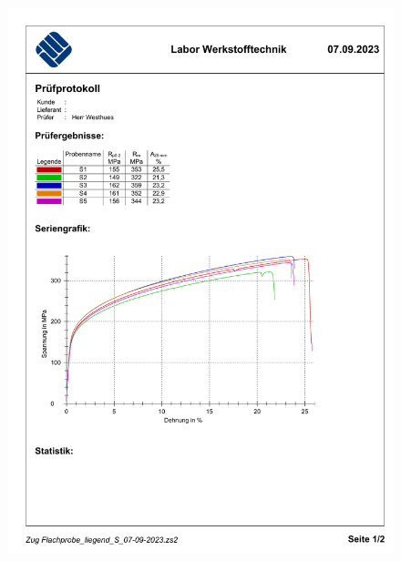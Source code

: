   \begin{figure}[ht]
    \includegraphics[width=1\textwidth]{bilder/Zug Flachprobe_liegend_S.pdf}
  \end{figure}
  \FloatBarrier
  
